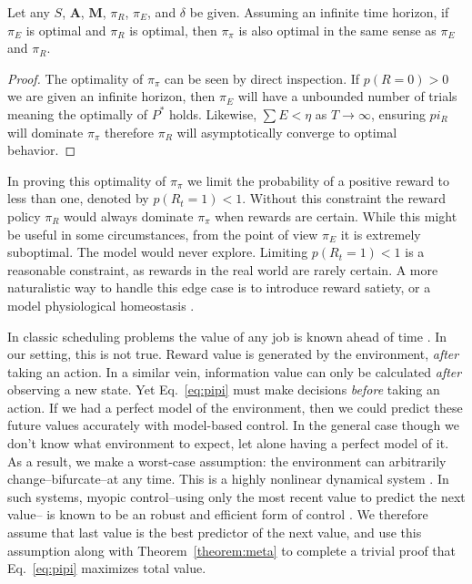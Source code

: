 \begin{theorem}[$\pi_{\pi}$ is unbiased] \label{theorem:meta} 
	 Let any $S$, $\mathbf{A}$, $\mathbf{M}$, $\pi_R$, $\pi_E$, and $\delta$ be given. Assuming an infinite time horizon, if $\pi_E$ is optimal and $\pi_R$ is optimal, then $\pi_{\pi}$ is also optimal in the same sense as $\pi_E$ and $\pi_R$. 
\end{theorem}
\begin{proof}
	The optimality of $\pi_{\pi}$ can be seen by direct inspection. If $p(R = 0) > 0$ we are given an infinite horizon, then $\pi_E$ will have a unbounded number of trials meaning the optimally of $P^*$ holds. Likewise, $\sum E < \eta$ as $T \rightarrow \infty$, ensuring $pi_R$ will dominate $\pi_{\pi}$ therefore $\pi_R$ will asymptotically converge to optimal behavior. 
\end{proof}

In proving this optimality of $\pi_{\pi}$ we limit the probability of a positive reward to less than one, denoted by $p(R_t = 1) < 1$. Without this constraint the reward policy $\pi_R$ would always dominate $\pi_{\pi}$ when rewards are certain. While this might be useful in some circumstances, from the point of view $\pi_E$ it is extremely suboptimal. The model would never explore. Limiting $p(R_t = 1) < 1$ is a reasonable constraint, as rewards in the real world are rarely certain. A more naturalistic way to handle this edge case is to introduce reward satiety, or a model physiological homeostasis \cite{Keramati2014,Juechems2019}.

In classic scheduling problems the value of any job is known ahead of time \cite{Bellmann1954,Roughgarden2019}. In our setting, this is not true. Reward value is generated by the environment, \textit{after} taking an action. In a similar vein, information value can only be calculated \textit{after} observing a new state. Yet Eq.~\ref{eq:pipi} must make decisions \textit{before} taking an action. If we had a perfect model of the environment, then we could predict these future values accurately with model-based control. In the general case though we don't know what environment to expect, let alone having a perfect model of it. As a result, we make a worst-case assumption: the environment can arbitrarily change--bifurcate--at any time. This is a highly nonlinear dynamical system \cite{Strogatz1994}. In such systems, myopic control--using only the most recent value to predict the next value-- is known to be an robust and efficient form of control \cite{Hocker2019}. We therefore assume that last value is the best predictor of the next value, and use this assumption along with Theorem~\ref{theorem:meta} to complete a trivial proof that Eq.~\ref{eq:pipi} maximizes total value.

